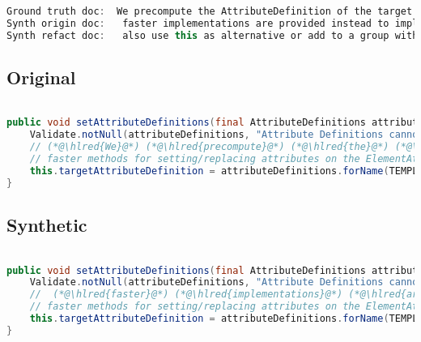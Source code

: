 \documentclass[11pt]{article}
\DeclareRobustCommand{\hlred}[1]{{\sethlcolor{YellowOrange}\hl{#1}}}
\begin{document}
  \begin{lstlisting}[language=java]
Ground truth doc:  We precompute the AttributeDefinition of the target attribute in order to being able to use much
Synth origin doc:   faster implementations are provided instead to implement additional and more sophisticated or intuitive or useful but
Synth refact doc:   also use this as alternative or add to a group with other groups for performance in
  \end{lstlisting}

  \subsection{Original}
  \begin{lstlisting}[language=java]

public void setAttributeDefinitions(final AttributeDefinitions attributeDefinitions) {
    Validate.notNull(attributeDefinitions, "Attribute Definitions cannot be null");
    // (*@\hlred{We}@*) (*@\hlred{precompute}@*) (*@\hlred{the}@*) (*@\hlred{AttributeDefinition}@*) (*@\hlred{of}@*) (*@\hlred{the}@*) (*@\hlred{target}@*) (*@\hlred{attribute}@*) (*@\hlred{in}@*) (*@\hlred{order}@*) (*@\hlred{to}@*) (*@\hlred{being}@*) (*@\hlred{able}@*) (*@\hlred{to}@*) (*@\hlred{use}@*) (*@\hlred{much}@*)
    // faster methods for setting/replacing attributes on the ElementAttributes implementation
    this.targetAttributeDefinition = attributeDefinitions.forName(TEMPLATE_MODE, TARGET_ATTR_NAME);
}
  \end{lstlisting}
  \subsection{Synthetic}

  \begin{lstlisting}[language=java]

public void setAttributeDefinitions(final AttributeDefinitions attributeDefinitions) {
    Validate.notNull(attributeDefinitions, "Attribute Definitions cannot be null");
    //  (*@\hlred{faster}@*) (*@\hlred{implementations}@*) (*@\hlred{are}@*) (*@\hlred{provided}@*) (*@\hlred{instead}@*) (*@\hlred{to}@*) (*@\hlred{implement}@*) (*@\hlred{additional}@*) (*@\hlred{and}@*) (*@\hlred{more}@*) (*@\hlred{sophisticated}@*) (*@\hlred{or}@*) (*@\hlred{intuitive}@*) (*@\hlred{or}@*) (*@\hlred{useful}@*) (*@\hlred{but}@*)
    // faster methods for setting/replacing attributes on the ElementAttributes implementation
    this.targetAttributeDefinition = attributeDefinitions.forName(TEMPLATE_MODE, TARGET_ATTR_NAME);
}
  \end{lstlisting}
\end{document}
